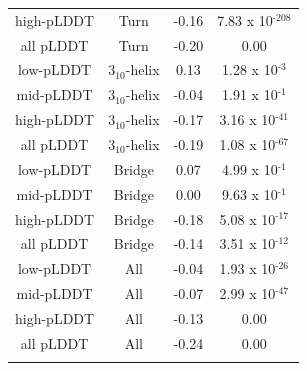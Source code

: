 \begin{table}[H]
\begin{tabular}{cccc}
high-pLDDT
& Turn                & -0.16                       & 7.83 x 10$^{\text{-208}}$    \\
all pLDDT& Turn                & -0.20                       & 0.00                         \\
\arrayrulecolor[gray]{0.8}\hline
low-pLDDT
& 3$_{10}$-helix      & 0.13                        & 1.28 x 10$^{\text{-3}}$      \\
mid-pLDDT
& 3$_{10}$-helix      & -0.04                       & 1.91 x 10$^{\text{-1}}$      \\
high-pLDDT
& 3$_{10}$-helix      & -0.17                       & 3.16 x 10$^{\text{-41}}$     \\
all pLDDT& 3$_{10}$-helix      & -0.19                       & 1.08 x 10$^{\text{-67}}$     \\
\arrayrulecolor[gray]{0.8}\hline
low-pLDDT
& Bridge              & 0.07                        & 4.99 x 10$^{\text{-1}}$      \\
mid-pLDDT
& Bridge              & 0.00                        & 9.63 x 10$^{\text{-1}}$      \\
high-pLDDT
& Bridge              & -0.18                       & 5.08 x 10$^{\text{-17}}$     \\
all pLDDT& Bridge              & -0.14                       & 3.51 x 10$^{\text{-12}}$     \\
\arrayrulecolor[gray]{0.8}\hline
low-pLDDT
& All                 & -0.04                       & 1.93 x 10$^{\text{-26}}$     \\
mid-pLDDT
& All                 & -0.07                       & 2.99 x 10$^{\text{-47}}$     \\
high-pLDDT
& All                 & -0.13                       & 0.00                         \\
all pLDDT& All                 & -0.24                       & 0.00  \\
\arrayrulecolor{black} \bottomrule
\end{tabular}
\end{table}


